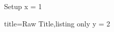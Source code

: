 \documentclass{article}
\begin{document}
\begin{tcbcode}{Setup}
x = 1
\end{tcbcode}
\begin{tcblisting}{title=Raw Title,listing only}
y = 2
\end{tcblisting}
\end{document}
